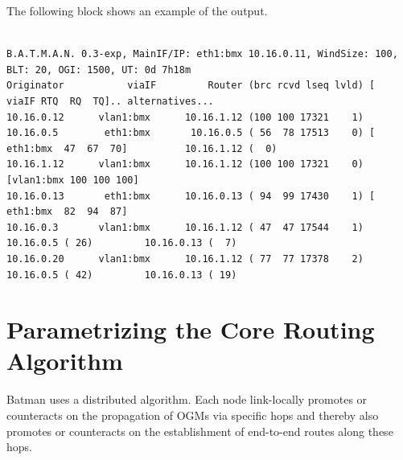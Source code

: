 \documentclass[11pt]{article}
\begin{document}
The following block shows an example of the output.

\begin{small}
\begin{verbatim}

B.A.T.M.A.N. 0.3-exp, MainIF/IP: eth1:bmx 10.16.0.11, WindSize: 100, BLT: 20, OGI: 1500, UT: 0d 7h18m
Originator           viaIF         Router (brc rcvd lseq lvld) [    viaIF RTQ  RQ  TQ].. alternatives...
10.16.0.12      vlan1:bmx      10.16.1.12 (100 100 17321    1)
10.16.0.5        eth1:bmx       10.16.0.5 ( 56  78 17513    0) [ eth1:bmx  47  67  70]          10.16.1.12 (  0)
10.16.1.12      vlan1:bmx      10.16.1.12 (100 100 17321    0) [vlan1:bmx 100 100 100]
10.16.0.13       eth1:bmx      10.16.0.13 ( 94  99 17430    1) [ eth1:bmx  82  94  87]
10.16.0.3       vlan1:bmx      10.16.1.12 ( 47  47 17544    1)          10.16.0.5 ( 26)         10.16.0.13 (  7)
10.16.0.20      vlan1:bmx      10.16.1.12 ( 77  77 17378    2)          10.16.0.5 ( 42)         10.16.0.13 ( 19)

\end{verbatim}
\end{small}






\section{Parametrizing the Core Routing Algorithm}

Batman uses a distributed algorithm. Each node link-locally promotes or counteracts on the propagation of OGMs via specific hops and thereby also promotes or counteracts on the establishment of end-to-end routes along these hops.
\end{document}
